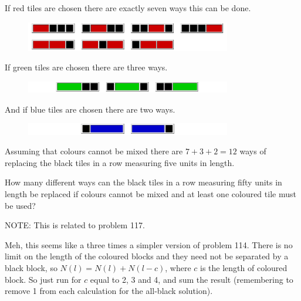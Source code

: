 If red tiles are chosen there are exactly seven ways this can be done.
\vspace{-0.5cm}
\begin{center}
\begin{figure}[h]
\centering
\includegraphics[width = 0.80\textwidth]{./images/p_116_1.png}
\end{figure}
\end{center}
\vspace{-1.25cm}
If green tiles are chosen there are three ways.
\vspace{-0.5cm}
\begin{center}
\begin{figure}[h]
\centering
\includegraphics[width = 0.80\textwidth]{./images/p_116_2.png}
\end{figure}
\end{center}
\vspace{-1.25cm}
And if blue tiles are chosen there are two ways.
\vspace{-0.5cm}
\begin{center}
\begin{figure}[h]
\centering
\includegraphics[width = 0.80\textwidth]{./images/p_116_3.png}
\end{figure}
\end{center}
\vspace{-1.25cm}
Assuming that colours cannot be mixed there are $7 + 3 + 2 = 12$ ways of replacing the black tiles in a row measuring five units in length.

How many different ways can the black tiles in a row measuring fifty units in length be replaced if colours cannot be mixed and at least one coloured tile must be used?

\footnotesize
NOTE: This is related to problem 117.
\normalsize

Meh, this seems like a three times a simpler version of problem 114.  There is no limit on the length of the coloured blocks and they need not be separated by a black block, so $N(l) = N(l)+N(l-c)$, where $c$ is the length of coloured block.  So just run for $c$ equal to 2, 3 and 4, and sum the result (remembering to remove 1 from each calculation for the all-black solution).

